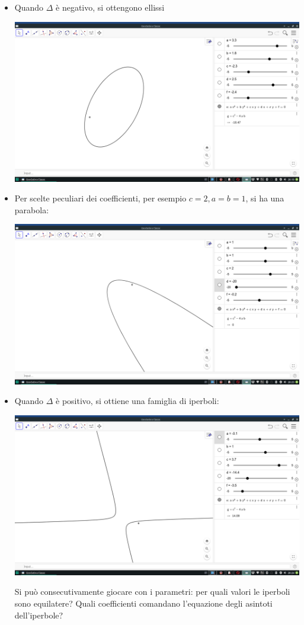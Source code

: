 \documentclass{amsart}
\begin{document}
\begin{itemize}
  \item Quando $\Delta$ è negativo, si ottengono ellissi
  \begin{center}
    \includegraphics[width=.75\textwidth]{elly.png}
  \end{center}
  \item Per scelte peculiari dei coefficienti, per esempio $c=2, a=b=1$, si ha una parabola:
  \begin{center}
    \includegraphics[width=.75\textwidth]{parab.png}
  \end{center}
  \item Quando $\Delta$ è positivo, si ottiene una famiglia di iperboli:
  \begin{center}
    \includegraphics[width=.75\textwidth]{hyper.png}
  \end{center}
  Si può consecutivamente giocare con i parametri: per quali valori le iperboli sono equilatere? Quali coefficienti comandano l'equazione degli asintoti dell'iperbole?
\end{itemize}
\end{document}
